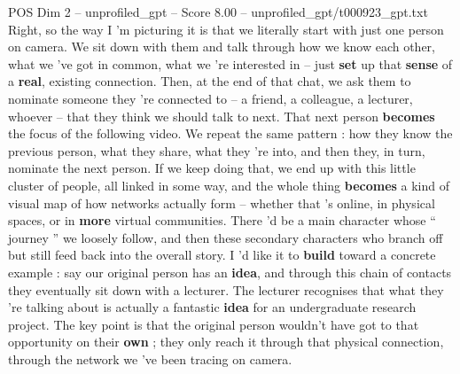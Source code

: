 \begin{textsample}{POS Dim 2 – unprofiled\_gpt – Score 8.00 – unprofiled\_gpt/t000923\_gpt.txt}  \label{ex:f2_pos_022}
Right, so the way I ’m picturing it is that we literally start with just one person on camera.
We sit down with them and talk through how we know each other, what we ’ve got in common, what we ’re interested in – just \textbf{set} up that \textbf{sense} of a \textbf{real}, existing connection.
Then, at the end of that chat, we ask them to nominate someone they ’re connected to – a friend, a colleague, a lecturer, whoever – that they think we should talk to next.
That next person \textbf{becomes} the focus of the following video.
We repeat the same pattern : how they know the previous person, what they share, what they ’re into, and then they, in turn, nominate the next person.
If we keep doing that, we end up with this little cluster of people, all linked in some way, and the whole thing \textbf{becomes} a kind of visual map of how networks actually form – whether that ’s online, in physical spaces, or in \textbf{more} virtual communities.
There ’d be a main character whose “ journey ” we loosely follow, and then these secondary characters who branch off but still feed back into the overall story.
I ’d like it to \textbf{build} toward a concrete example : say our original person has an \textbf{idea}, and through this chain of contacts they eventually sit down with a lecturer.
The lecturer recognises that what they ’re talking about is actually a fantastic \textbf{idea} for an undergraduate research project.
The key point is that the original person wouldn't have got to that opportunity on their \textbf{own} ; they only reach it through that physical connection, through the network we ’ve been tracing on camera.

\end{textsample}
